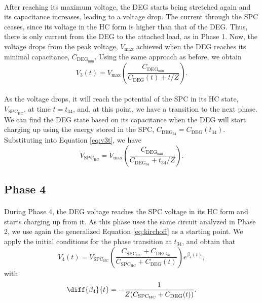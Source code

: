 \paragraph{} After reaching its maximum voltage, the DEG starts being stretched again and its capacitance increases, leading to a voltage drop. The current through the SPC ceases, since its voltage in the HC form is higher than that of the DEG. Thus, there is only current from the DEG to the attached load, as in Phase 1. Now, the voltage drops from the peak voltage, $V_\text{max}$ achieved when the DEG reaches its minimal capacitance, $C_{\text{DEG}_\text{min}}$. Using the same approach as before, we obtain
\begin{equation}\label{eq:v3t}
V_{3}(t) = V_\text{max}\left(\frac{C_{\text{DEG}_\text{min}}}{C_\text{DEG}(t)+t/Z}\right).
\end{equation}

\paragraph{} As the voltage drops, it will reach the potential of the SPC in its HC state, $V_{\text{SPC}_\text{HC}}$, at time $t=t_{34}$, and, at this point, we have a transition to the next phase. We can find the DEG state based on its capacitance when the DEG will start charging up using the energy stored in the SPC, $C_{\text{DEG}_{34}} = C_\text{DEG}(t_{34})$. Substituting into Equation \ref{eq:v3t}, we have
\begin{equation}
V_{\text{SPC}_\text{HC}} = V_\text{max}\left(\frac{C_{\text{DEG}_\text{min}}}{C_{\text{DEG}_{34}}+t_{34}/Z}\right).
\end{equation}

\subsection{Phase 4}

\paragraph{} During Phase 4, the DEG voltage reaches the SPC voltage in its HC form and starts charging up from it. As this phase uses the same circuit analyzed in Phase 2, we use again the generalized Equation \ref{eq:kirchoff} as a starting point. We apply the initial conditions for the phase transition at $t_{34}$, and obtain that
\begin{equation}\label{eq:v4t}
V_4(t) = V_{\text{SPC}_\text{HC}}\left(\frac{C_{\text{SPC}_\text{HC}}+C_{\text{DEG}_{34}}}{C_{\text{SPC}_\text{HC}}+C_\text{DEG}(t)}\right)e^{\beta_4(t)},
\end{equation}
with
\begin{equation}
\diff{\beta_4}{t} = -\frac{1}{Z(C_{\text{SPC}_\text{HC}}+C_\text{DEG}(t))}.
\end{equation}


